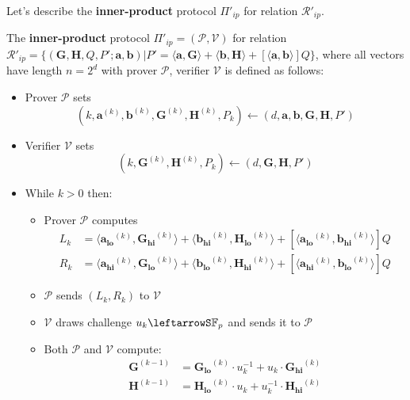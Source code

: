 \documentclass[../lecture-notes-148x210.tex]{subfiles}
\begin{document}
Let's describe the \textbf{inner-product} protocol $\Pi'_{ip}$ for relation $\mathcal{R}'_{ip}$. 
\begin{definition}
    The \textbf{inner-product} protocol $\Pi'_{ip} = (\mathcal{P}, \mathcal{V})$ for relation $\mathcal{R}'_{ip} = \{ (\mathbf{G,H}, Q, P'; \mathbf{a,b}) \vert P' = \langle \mathbf{a,G} \rangle + \langle \mathbf{b,H} \rangle + [\langle \mathbf{a,b} \rangle]Q \}$, where all vectors have length $n=2^d$ with prover $\mathcal{P}$, verifier $\mathcal{V}$ is defined as follows:
    \begin{itemize}
        \item Prover $\mathcal{P}$ sets $$(k, \mathbf{a}^{(k)}, \mathbf{b}^{(k)}, \mathbf{G}^{(k)}, \mathbf{H}^{(k)}, P_k) \gets (d, \mathbf{a,b,G,H},P')$$
        \item Verifier $\mathcal{V}$ sets $$(k, \mathbf{G}^{(k)}, \mathbf{H}^{(k)}, P_k) \gets (d, \mathbf{G,H},P')$$
        \item While $k > 0$ then:
            \begin{itemize}
                \item Prover $\mathcal{P}$ computes 
                    \begin{align*}
                        L_{k} &= \langle \mathbf{a_{lo}}^{(k)}, \mathbf{G_{hi}}^{(k)}\rangle + \langle \mathbf{b_{hi}}^{(k)}, \mathbf{H_{lo}}^{(k)}\rangle + [\langle \mathbf{a_{lo}}^{(k)}, \mathbf{b_{hi}}^{(k)}\rangle]Q \\
                        R_{k} &= \langle \mathbf{a_{hi}}^{(k)}, \mathbf{G_{lo}}^{(k)}\rangle + \langle \mathbf{b_{lo}}^{(k)}, \mathbf{H_{hi}}^{(k)}\rangle + [\langle \mathbf{a_{hi}}^{(k)}, \mathbf{b_{lo}}^{(k)}\rangle]Q
                    \end{align*}
                \item $\mathcal{P}$ sends $(L_k, R_k)$ to $\mathcal{V}$
                \item $\mathcal{V}$ draws challenge $u_k \leftarrowS \mathbb{F}_p$ and sends it to $\mathcal{P}$
                \item Both $\mathcal{P}$ and $\mathcal{V}$ compute:
                    \begin{align*}
                        \mathbf{G}^{(k-1)} &= \mathbf{G_{lo}}^{(k)} \cdot u_k^{-1} + u_k \cdot \mathbf{G_{hi}}^{(k)} \\
                        \mathbf{H}^{(k-1)} &= \mathbf{H_{lo}}^{(k)} \cdot u_k + u_k^{-1} \cdot \mathbf{H_{hi}}^{(k)}
                    \end{align*}

\end{itemize}
\end{itemize}
\end{definition}
\end{document}
